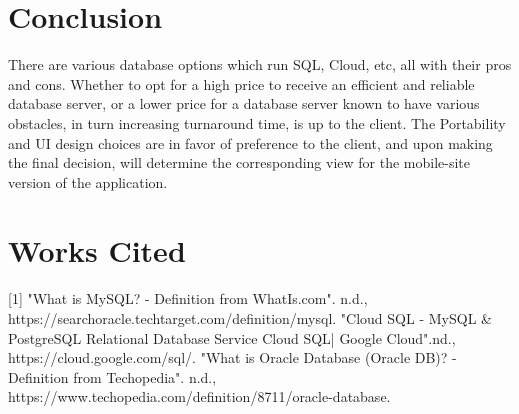 \documentclass{article}
\begin{document}
\section{Conclusion}
There are various database options which run SQL, Cloud, etc, all with their pros and cons. Whether to opt for a high price to receive an efficient and reliable database server, or a lower price for a database server known to have various obstacles, in turn increasing turnaround time, is up to the client.
The Portability and UI design choices are in favor of preference to the client, and upon making the final decision, will determine the corresponding view for the mobile-site version of the application.

\newpage
\section{Works Cited}

[1] "What is MySQL? - Definition from WhatIs.com". n.d., \newline https://searchoracle.techtarget.com/definition/mysql.
\newline\newline [2] "Cloud SQL - MySQL \& PostgreSQL Relational Database Service  Cloud SQL| Google Cloud".nd., https://cloud.google.com/sql/.
\newline\newline [3] "What is Oracle Database (Oracle DB)? - Definition from Techopedia". n.d., https://www.techopedia.com/definition/8711/oracle-database.
\end{document}
